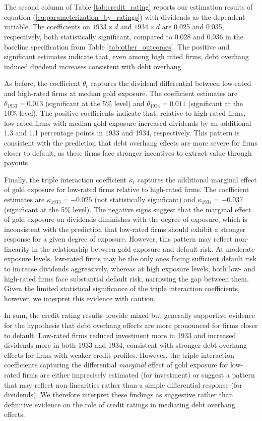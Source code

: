The second column of Table \ref{tab:credit_rating} reports our estimation results of equation (\ref{eq:parameterization_by_ratings}) with dividends as the dependent variable. The coefficients on $1933 \times \tilde{d}$ and $1934 \times \tilde{d}$ are 0.025 and 0.035, respectively, both statistically significant, compared to 0.028 and 0.036 in the baseline specification from Table \ref{tab:other_outcomes}. The positive and significant estimates indicate that, even among high rated firms, debt overhang induced dividend increases consistent with debt overhang.

As before, the coefficient $\theta_t$ captures the dividend differential between low-rated and high-rated firms at median gold exposure. The coefficient estimates are $\theta_{1933} = 0.013$ (significant at the 5\% level) and $\theta_{1934} = 0.011$ (significant at the 10\% level). The positive coefficients indicate that, relative to high-rated firms, low-rated firms with median gold exposure increased dividends by an additional 1.3 and 1.1 percentage points in 1933 and 1934, respectively. This pattern is consistent with the prediction that debt overhang effects are more severe for firms closer to default, as these firms face stronger incentives to extract value through payouts.

Finally, the triple interaction coefficient $\kappa_t$ captures the additional marginal effect of gold exposure for low-rated firms relative to high-rated firms. The coefficient estimates are $\kappa_{1933} = -0.025$ (not statistically significant) and $\kappa_{1934} = -0.037$ (significant at the 5\% level). The negative signs suggest that the marginal effect of gold exposure on dividends diminishes with the degree of exposure, which is inconsistent with the prediction that low-rated firms should exhibit a stronger response for a given degree of exposure. However, this pattern may reflect non-linearity in the relationship between gold exposure and default risk. At moderate exposure levels, low-rated firms may be the only ones facing sufficient default risk to increase dividends aggressively, whereas at high exposure levels, both low- and high-rated firms face substantial default risk, narrowing the gap between them. Given the limited statistical significance of the triple interaction coefficients, however, we interpret this evidence with caution.

In sum, the credit rating results provide mixed but generally supportive evidence for the hypothesis that debt overhang effects are more pronounced for firms closer to default. Low-rated firms reduced investment more in 1933 and increased dividends more in both 1933 and 1934, consistent with stronger debt overhang effects for firms with weaker credit profiles. However, the triple interaction coefficients capturing the differential \textit{marginal} effect of gold exposure for low-rated firms are either imprecisely estimated (for investment) or suggest a pattern that may reflect non-linearities rather than a simple differential response (for dividends). We therefore interpret these findings as suggestive rather than definitive evidence on the role of credit ratings in mediating debt overhang effects.

